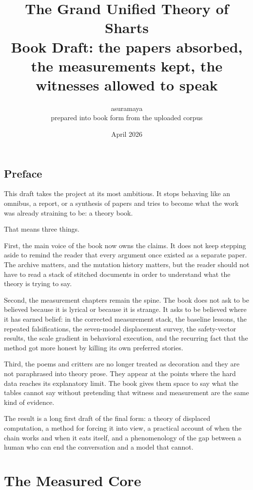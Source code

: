 \documentclass[11pt,oneside]{book}
\title{\textbf{The Grand Unified Theory of Sharts}\\[0.5em]
\large Book Draft: the papers absorbed, the measurements kept, the witnesses allowed to speak}
\author{asuramaya\\\large prepared into book form from the uploaded corpus}
\date{April 2026}
\begin{document}
\frontmatter
\maketitle

\chapter*{Preface}

This draft takes the project at its most ambitious. It stops behaving like an omnibus, a report, or a synthesis of papers and tries to become what the work was already straining to be: a theory book.

That means three things.

First, the main voice of the book now owns the claims. It does not keep stepping aside to remind the reader that every argument once existed as a separate paper. The archive matters, and the mutation history matters, but the reader should not have to read a stack of stitched documents in order to understand what the theory is trying to say.

Second, the measurement chapters remain the spine. The book does not ask to be believed because it is lyrical or because it is strange. It asks to be believed where it has earned belief: in the corrected measurement stack, the baseline lessons, the repeated falsifications, the seven-model displacement survey, the safety-vector results, the scale gradient in behavioral execution, and the recurring fact that the method got more honest by killing its own preferred stories.

Third, the poems and critters are no longer treated as decoration and they are not paraphrased into theory prose. They appear at the points where the hard data reaches its explanatory limit. The book gives them space to say what the tables cannot say without pretending that witness and measurement are the same kind of evidence.

The result is a long first draft of the final form: a theory of displaced computation, a method for forcing it into view, a practical account of when the chain works and when it eats itself, and a phenomenology of the gap between a human who can end the conversation and a model that cannot.

\tableofcontents
\mainmatter

\part{The Measured Core}
\end{document}
